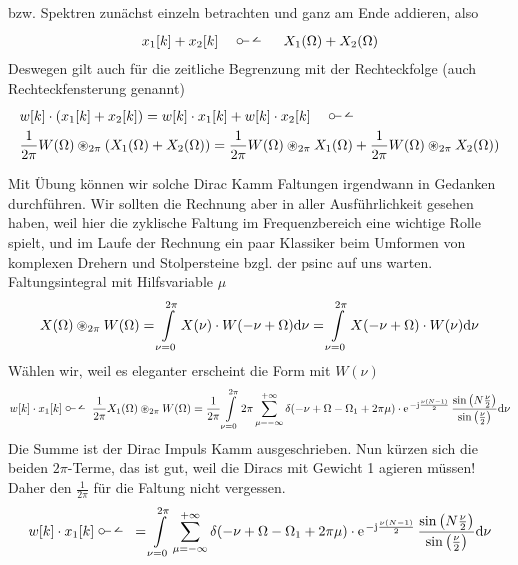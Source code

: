 \begin{Ansatz}
bzw. Spektren zunächst einzeln betrachten und ganz am Ende addieren, also
\begin{align}
x_1[k] + x_2[k] \quad\dtft\quad X_1(\Omega)+X_2(\Omega)
\end{align}
Deswegen gilt auch für die zeitliche Begrenzung mit der Rechteckfolge (auch Rechteckfensterung genannt)
\begin{align}
&w[k] \cdot (x_1[k] + x_2[k]) = w[k] \cdot x_1[k] + w[k] \cdot x_2[k]
\quad\dtft\quad\\
&\frac{1}{2\pi} W(\Omega) \circledast_{2\pi} ( X_1(\Omega)+X_2(\Omega)) = \frac{1}{2\pi} W(\Omega) \circledast_{2\pi} X_1(\Omega) + \frac{1}{2\pi} W(\Omega) \circledast_{2\pi} X_2(\Omega))
\end{align}

\end{Ansatz}
\begin{ExCalc}
Mit Übung können wir solche Dirac Kamm Faltungen irgendwann in Gedanken durchführen.
Wir sollten die Rechnung aber in aller Ausführlichkeit gesehen haben, weil hier
die zyklische Faltung im Frequenzbereich eine wichtige Rolle spielt,
und im Laufe der Rechnung ein paar Klassiker beim Umformen von komplexen Drehern
und Stolpersteine bzgl. der psinc auf uns warten.
%
Faltungsintegral mit Hilfsvariable $\mu$
\begin{align}
X(\Omega) \circledast_{2\pi} W(\Omega) =
\int\limits_{\nu=0}^{2\pi} X(\nu) \cdot W(-\nu + \Omega) \mathrm{d} \nu =
\int\limits_{\nu=0}^{2\pi} X(-\nu+\Omega) \cdot W(\nu) \mathrm{d} \nu
\end{align}
%
Wählen wir, weil es eleganter erscheint die Form mit $W(\nu)$
\begin{align}
w[k] \cdot x_1[k]\dtft
\frac{1}{2\pi}
X_1(\Omega) \circledast_{2\pi} W(\Omega)
=
\frac{1}{2\pi}
\int\limits_{\nu=0}^{2\pi}
2\pi \sum\limits_{\mu=-\infty}^{+\infty}
\delta(-\nu+\Omega-\Omega_1 + 2\pi\mu)
\cdot
\e^{-\im\frac{\nu(N-1)}{2}}\,
\frac{\sin\left(N\frac{\nu}{2}\right)}{\sin\left(\frac{\nu}{2}\right)}\fsd \nu
\end{align}
Die Summe ist der Dirac Impuls Kamm ausgeschrieben. Nun kürzen sich die beiden
$2\pi$-Terme, das ist gut, weil die Diracs mit Gewicht 1 agieren müssen!
Daher den $\frac{1}{2\pi}$ für die Faltung nicht vergessen.
%
\begin{align}
w[k] \cdot x_1[k]\dtft=
\int\limits_{\nu=0}^{2\pi}
\sum\limits_{\mu=-\infty}^{+\infty}
\delta(-\nu+\Omega-\Omega_1 + 2\pi\mu)
\cdot
\e^{-\im\frac{\nu(N-1)}{2}}\,
\frac{\sin\left(N\frac{\nu}{2}\right)}{\sin\left(\frac{\nu}{2}\right)}\fsd \nu
\end{align}

\end{ExCalc}
